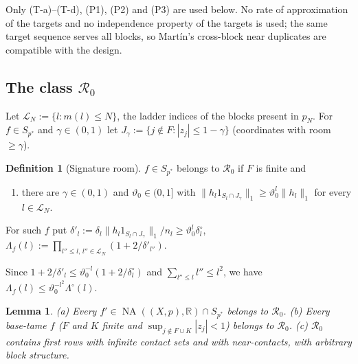 \documentclass[10pt]{amsart}
\newtheorem{lemma}[theorem]{Lemma}
\theoremstyle{definition}
\newtheorem{definition}[theorem]{Definition}
\theoremstyle{remark}
\newcommand{\NA}{\operatorname{NA}}
\newcommand{\R}{\mathbb R}
\begin{document}
Only (T-a)--(T-d), (P1), (P2) and (P3) are used below.  No rate of
approximation of the targets and no independence property of the targets
is used; the same target sequence serves all blocks, so Mart\'in's
cross-block near duplicates are compatible with the design.

\subsection{The class $\mathcal R_0$}
Let $\mathcal L_N:=\{l:m(l)\le N\}$, the ladder indices of the blocks
present in $p_N$.  For $f\in S_{p^*}$ and $\gamma\in(0,1)$ let
$J_\gamma:=\{j\notin F:|z_j|\le1-\gamma\}$ (coordinates with room
$\ge\gamma$).

\begin{definition}[Signature room]\label{def:R0}
$f\in S_{p^*}$ belongs to $\mathcal R_0$ if $F$ is finite and
\begin{enumerate}
\item[(SR)] there are $\gamma\in(0,1)$ and $\vartheta_0\in(0,1]$ with
$\|h_l1_{S_l\cap J_\gamma}\|_1\ge\vartheta_0^l\|h_l\|_1$ for every
$l\in\mathcal L_N$.
\end{enumerate}
For such $f$ put $\delta'_l:=\delta_l\|h_l1_{S_l\cap J_\gamma}\|_1/n_l\ge
\vartheta_0^l\delta^\circ_l$, $\Lambda_f(l):=\prod_{l''\le l,\,l''\in
\mathcal L_N}(1+2/\delta'_{l''})$.
\end{definition}

Since $1+2/\delta'_l\le\vartheta_0^{-l}(1+2/\delta^\circ_l)$ and
$\sum_{l''\le l}l''\le l^2$, we have $\Lambda_f(l)\le\vartheta_0^{-l^2}
\Lambda^\circ(l)$.

\begin{lemma}\label{lem:R0}
\textup{(a)} Every $f'\in\NA((X,p),\R)\cap S_{p^*}$ belongs to
$\mathcal R_0$.  \textup{(b)} Every \emph{base-tame} $f$ \textup{(}$F$ and
$K$ finite and $\sup_{j\notin F\cup K}|z_j|<1$\textup{)} belongs to
$\mathcal R_0$.  \textup{(c)} $\mathcal R_0$ contains first rows with
infinite contact sets and with near-contacts, with arbitrary block
structure.
\end{lemma}
\end{document}
